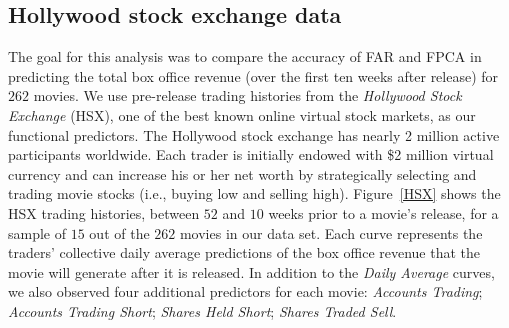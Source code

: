 \documentclass[aos,MSNbibl,dvips]{arximspdf}
\begin{document}

\subsection{Hollywood stock exchange data}
\label{sechsx}


The goal for this analysis was to compare the accuracy of FAR and FPCA
in predicting the total box office revenue (over the first ten weeks
after release) for $262$ movies. We use pre-release trading histories
from the \textit{Hollywood Stock Exchange} (HSX), one of the best known
online virtual stock markets, as our functional predictors.
The Hollywood stock exchange has nearly 2 million active participants
worldwide. Each trader is initially endowed with \$2 million virtual
currency and can increase his or her net worth by strategically
selecting and trading movie stocks (i.e., buying low and selling high).
Figure~\ref{HSX} shows the HSX trading histories, between $52$ and
$10$ weeks prior to a movie's release, for a sample of $15$ out of the
$262$ movies in our data set. Each curve represents the traders'
collective daily average predictions of the box office revenue that the
movie will generate after it is released. In addition to the \textit{Daily
Average} curves, we also observed four additional predictors for each
movie: \textit{Accounts Trading}; \textit{Accounts Trading Short};
\textit{Shares Held
Short}; \textit{Shares Traded Sell}.
\end{document}
